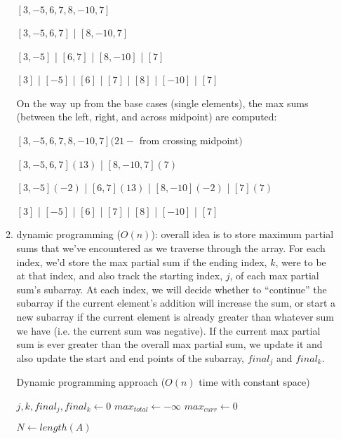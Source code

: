 \documentclass[12pt]{article}
\begin{document}
\begin{enumerate}
\begin{enumerate}
        \begin{center}
            $[3, -5, 6, 7, 8, -10, 7]$

            $[3, -5, 6, 7]$ | $[8, -10, 7]$

            $[3, -5]$ | $[6, 7]$ | $[8, -10]$ | $[7]$

            $[3]$ | $[-5]$ | $[6]$ | $[7]$ | $[8]$ | $[-10]$ | $[7]$
        \end{center}

        On the way up from the base cases (single elements), the max sums (between the left, right, and across midpoint) 
        are computed:

        \begin{center}
            $[3, -5, 6, 7, 8, -10, 7] (21 -$ from crossing midpoint$)$

            $[3, -5, 6, 7] (13)$ | $[8, -10, 7] (7)$

            $[3, -5] (-2)$ | $[6, 7] (13)$ | $[8, -10] (-2)$ | $[7](7)$

            $[3]$ | $[-5]$ | $[6]$ | $[7]$ | $[8]$ | $[-10]$ | $[7]$
        \end{center}

        \item
        dynamic programming ($O(n)$):
        overall idea is to store maximum partial sums that we've encountered as we traverse through the array. For each index, 
        we'd store the max partial sum if the ending index, $k$, were to be at that index, and also track the starting index, 
        $j$, of each max partial sum's subarray. At each index, we will decide whether to ``continue'' the subarray if the 
        current element's addition will increase the sum, or start a new subarray if the current element is already greater 
        than whatever sum we have (i.e. the current sum was negative). If the current max partial sum is ever greater than 
        the overall max partial sum, we update it and also update the start and end points of the subarray, $final_j$ and $final_k$.

        \begin{algorithm}
            \caption{Dynamic programming approach ($O(n)$ time with constant space)}
            \begin{algorithmic}
                \State $j, k, final_j, final_k \gets 0$
                \State $max_{total} \gets -\infty$
                \State $max_{curr} \gets 0$
                
                \State $N \gets length(A)$
                

\end{algorithmic}
\end{algorithm}
\end{enumerate}
\end{enumerate}
\end{document}
